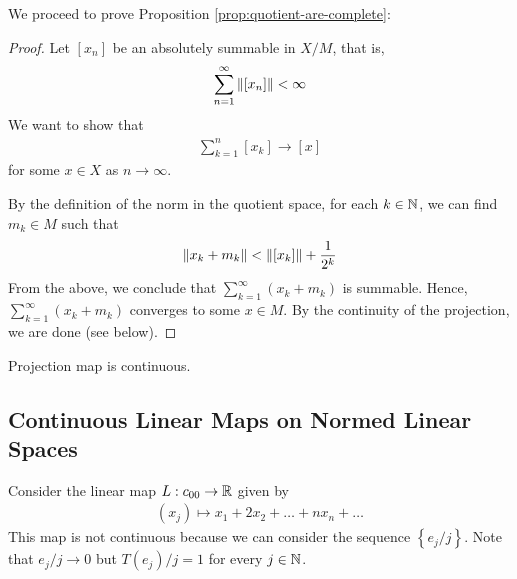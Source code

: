 We proceed to prove Proposition \ref{prop:quotient-are-complete}:

\begin{proof}
    Let $[x_{n}]$ be an absolutely summable in $X/M$, that is, 
    \begin{align*}
	\sum_{n=1}^{\infty} \left\lVert [x_{n}] \right\rVert < \infty
    \end{align*}
    We want to show that 
    \begin{align*}
	\sum_{k=1}^{n} [x_{k}] \to [x] 
    \end{align*}
    for some $x\in X$ as $n\to \infty$.

    By the definition of the norm in the quotient space, for each $k\in \mathbb N$, we can find $m_{k} \in M$ such that
    \begin{align*}
	\left\lVert x_{k} + m_{k} \right\rVert < \left\lVert [x_{k}] \right\rVert + \frac{1}{2^{k}}
    \end{align*}
    From the above, we conclude that $\sum_{k=1}^{\infty} (x_{k} + m_{k})$ is summable. Hence,  $\sum_{k=1}^{\infty} (x_{k} + m_{k})$ converges to some $x\in M$. By the continuity of the projection, we are done (see below).
\end{proof}

\begin{proposition}
    Projection map is continuous.
    \label{prop:proj-is-cont}
\end{proposition}

\subsection{Continuous Linear Maps on Normed Linear Spaces}

\begin{example}
    Consider the linear map $L: c_{00} \to \mathbb R$ given by
    \begin{align*}
	\left( x_{j} \right) \mapsto x_{1} + 2 x_{2} + \ldots + nx_{n} + \ldots
    \end{align*}
    This map is not continuous because we can consider the sequence $\left\{ e_{j}/j \right\}$. Note that $e_{j} /j \to 0$ but $T\left( e_{j} \right)/j = 1$ for every $j\in \mathbb N$.
\end{example}

